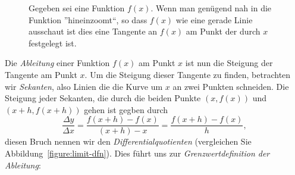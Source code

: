 \begin{figure*}
\caption{Gegeben sei eine Funktion $f(x)$. Wenn man genügend nah in die Funktion ''hineinzoomt``, so dass $f(x)$ wie eine gerade Linie ausschaut ist dies eine Tangente an $f(x)$ am Punkt der durch $x$ festgelegt ist.}
\label{figure:informal-tangent}
\end{figure*}


Die \textit{Ableitung} einer Funktion $f(x)$ am Punkt $x$ ist nun die Steigung der Tangente am Punkt $x$. Um die Steigung dieser Tangente zu finden, betrachten wir \textit{Sekanten}, also Linien die die Kurve um $x$ an zwei Punkten schneiden. Die Steigung jeder Sekanten, die durch die beiden Punkte $(x,f(x))$ und $(x+h,f(x+h))$ gehen ist gegben durch
\[
\frac{\Delta y}{\Delta x}=\frac{f(x+h) -f(x)}{(x+h)-x} = \frac{f(x+h)-f(x)}{h},
\]
diesen Bruch nennen wir den \textit{Differentialquotienten} (vergleichen Sie Abbildung~\ref{figure:limit-dfn}). Dies führt uns zur \textit{Grenzwertdefinition der Ableitung}:


